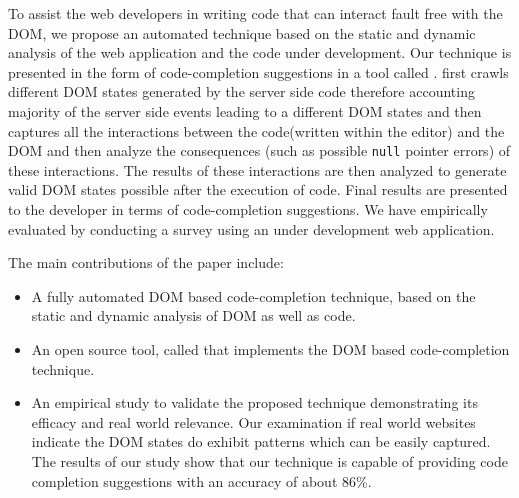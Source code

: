 To assist the web developers in writing \javascript code that can interact fault free with the DOM, we propose an automated technique based on the static and dynamic analysis of the web application and the \javascript code under development. Our technique is presented in the form of code-completion suggestions in a tool called \dompletion. \dompletion first crawls different DOM states generated by the server side code therefore accounting majority of the server side events leading to a different DOM states and then captures all the interactions between the \javascript code(written within the editor) and the DOM and then analyze the consequences (such as possible \texttt{null} pointer errors) of these interactions. The results of these interactions are then analyzed to generate valid DOM states possible after the execution of \javascript code. Final results are presented to the developer in terms of code-completion suggestions. We have empirically evaluated \dompletion by conducting a survey using an under development web application. 


The main contributions of the paper include: 
\begin{itemize}
	
	\item A fully automated DOM based code-completion technique, based on the static and dynamic analysis of DOM as well as \javascript code.
	\item An open source tool, called \dompletion that implements the DOM based code-completion technique.
	\item An empirical study to validate the proposed technique demonstrating its efficacy and real world relevance. Our examination if real world websites indicate the DOM states do exhibit \css patterns which can be easily captured. The results of our study show that our technique is capable of providing code completion suggestions with an accuracy of about 86\%.
\end{itemize} 
